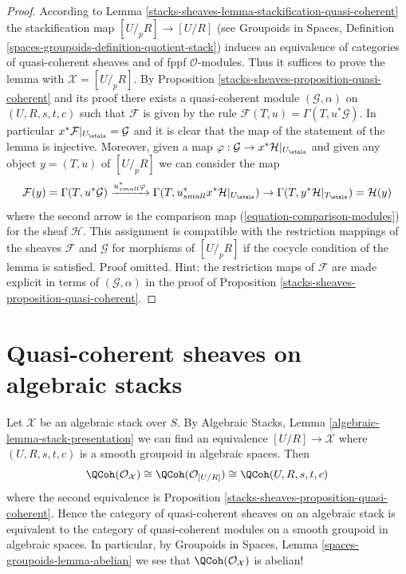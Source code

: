 \begin{proof}
According to
Lemma \ref{stacks-sheaves-lemma-stackification-quasi-coherent}
the stackification map $[U/_{\!p}R] \to [U/R]$ (see
Groupoids in Spaces, Definition
\ref{spaces-groupoids-definition-quotient-stack})
induces an equivalence of categories of quasi-coherent sheaves
and of fppf $\mathcal{O}$-modules.
Thus it suffices to prove the lemma with $\mathcal{X} = [U/_{\!p}R]$.
By Proposition \ref{stacks-sheaves-proposition-quasi-coherent}
and its proof there exists a quasi-coherent module
$(\mathcal{G}, \alpha)$ on $(U, R, s, t, c)$ such that
$\mathcal{F}$ is given by the rule
$\mathcal{F}(T, u) = \Gamma(T, u^*\mathcal{G})$.
In particular $x^*\mathcal{F}|_{U_\etale} = \mathcal{G}$
and it is clear that the map of the statement of the
lemma is injective. Moreover, given a map
$\varphi : \mathcal{G} \to x^*\mathcal{H}|_{U_\etale}$
and given any object
$y = (T, u)$ of $[U/_{\!p}R]$ we can consider the map
$$
\mathcal{F}(y) = \Gamma(T, u^*\mathcal{G})
\xrightarrow{u_{small}^*\varphi}
\Gamma(T, u_{small}^*x^*\mathcal{H}|_{U_\etale})
\rightarrow
\Gamma(T, y^*\mathcal{H}|_{T_\etale}) = \mathcal{H}(y)
$$
where the second arrow is the comparison map
(\ref{equation-comparison-modules}) for the sheaf $\mathcal{H}$.
This assignment is compatible with the restriction mappings of the
sheaves $\mathcal{F}$ and $\mathcal{G}$ for morphisms of
$[U/_{\!p}R]$ if the cocycle condition of
the lemma is satisfied. Proof omitted. Hint: the restriction maps
of $\mathcal{F}$ are made explicit in terms of $(\mathcal{G}, \alpha)$
in the proof of
Proposition \ref{stacks-sheaves-proposition-quasi-coherent}.
\end{proof}

\section{Quasi-coherent sheaves on algebraic stacks}
\label{stacks-sheaves-section-quasi-coherent-algebraic-stacks}
Let $\mathcal{X}$ be an algebraic stack over $S$. By
Algebraic Stacks, Lemma \ref{algebraic-lemma-stack-presentation}
we can find an equivalence $[U/R] \to \mathcal{X}$
where $(U, R, s, t, c)$ is a smooth groupoid in algebraic spaces.
Then
$$
\QCoh(\mathcal{O}_\mathcal{X})
\cong
\QCoh(\mathcal{O}_{[U/R]})
\cong
\QCoh(U, R, s, t, c)
$$
where the second equivalence is
Proposition \ref{stacks-sheaves-proposition-quasi-coherent}.
Hence the category of quasi-coherent sheaves on an algebraic stack
is equivalent to the category of quasi-coherent modules on a smooth
groupoid in algebraic spaces. In particular, by
Groupoids in Spaces, Lemma \ref{spaces-groupoids-lemma-abelian}
we see that $\QCoh(\mathcal{O}_\mathcal{X})$ is abelian!

